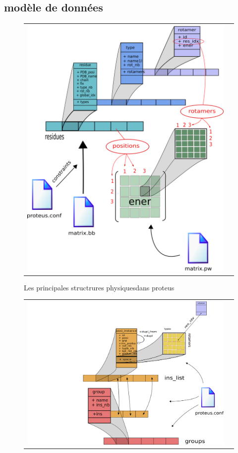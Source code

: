 \begin{enumerate}
   

\subsection{modèle de données} 


   \begin{figure}[!htbp]
     \centering
     \begin{tabular}{cc}
       \includegraphics[width=12cm]{figure/proteus/structures_physique.png} &
     \end{tabular}
     
     \caption{Les principales structrures \og physiques\fg dans proteus}
\label{graph:struct_Phy}
   \end{figure}



   \begin{figure}[!htbp]
     \centering
     \begin{tabular}{cc}
       \includegraphics[width=12cm]{figure/proteus/structures_modele_logique.png} &
     \end{tabular}
     

\end{figure}
\end{enumerate}
